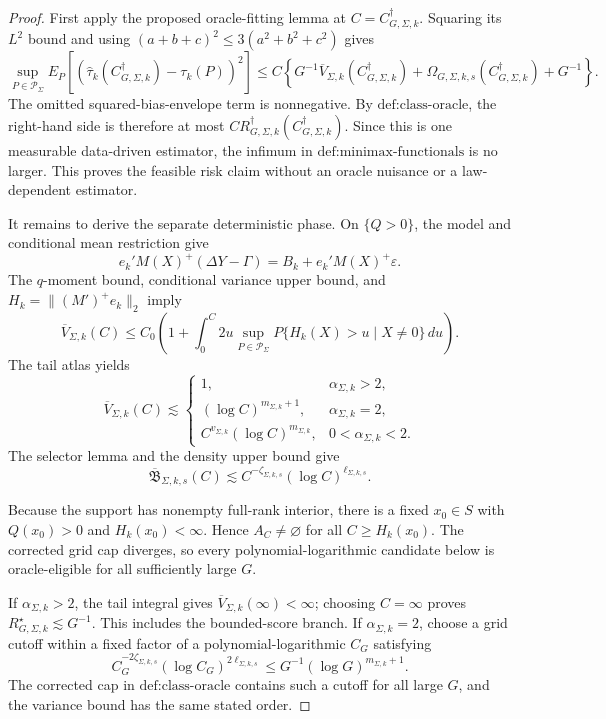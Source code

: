 \documentclass{article}
\begin{document}
\begin{proof}
First apply the proposed oracle-fitting lemma at \(C=C_{G,\Sigma,k}^{\dagger}\). Squaring its \(L^2\) bound and using \((a+b+c)^2\le3(a^2+b^2+c^2)\) gives
\[
\sup_{P\in\mathcal P_\Sigma}E_P[(\widehat\tau_k(C_{G,\Sigma,k}^{\dagger})-\tau_k(P))^2]
\le C\left\{G^{-1}\overline V_{\Sigma,k}(C_{G,\Sigma,k}^{\dagger})
+\Omega_{G,\Sigma,k,s}(C_{G,\Sigma,k}^{\dagger})+G^{-1}\right\}.
\]
The omitted squared-bias-envelope term is nonnegative. By \(\text{def:class-oracle}\), the right-hand side is therefore at most \(C R_{G,\Sigma,k}^{\dagger}(C_{G,\Sigma,k}^{\dagger})\). Since this is one measurable data-driven estimator, the infimum in \(\text{def:minimax-functionals}\) is no larger. This proves the feasible risk claim without an oracle nuisance or a law-dependent estimator.

It remains to derive the separate deterministic phase. On \(\{Q>0\}\), the model and conditional mean restriction give
\[
e_k'M(X)^+(\Delta Y-\Gamma)=B_k+e_k'M(X)^+\varepsilon.
\]
The \(q\)-moment bound, conditional variance upper bound, and \(H_k=\|(M')^+e_k\|_2\) imply
\[
\overline V_{\Sigma,k}(C)
\le C_0\left(1+\int_0^C2u\sup_{P\in\mathcal P_\Sigma}P\{H_k(X)>u\mid X\ne0\}\,du\right).
\]
The tail atlas yields
\[
\overline V_{\Sigma,k}(C)\lesssim
\begin{cases}
1,&\alpha_{\Sigma,k}>2,\\
(\log C)^{m_{\Sigma,k}+1},&\alpha_{\Sigma,k}=2,\\
C^{v_{\Sigma,k}}(\log C)^{m_{\Sigma,k}},&0<\alpha_{\Sigma,k}<2.
\end{cases}
\]
The selector lemma and the density upper bound give
\[
\overline{\mathfrak B}_{\Sigma,k,s}(C)
\lesssim C^{-\zeta_{\Sigma,k,s}}(\log C)^{\ell_{\Sigma,k,s}}.
\]

Because the support has nonempty full-rank interior, there is a fixed \(x_0\in S\) with \(Q(x_0)>0\) and \(H_k(x_0)<\infty\). Hence \(A_C\ne\varnothing\) for all \(C\ge H_k(x_0)\). The corrected grid cap diverges, so every polynomial-logarithmic candidate below is oracle-eligible for all sufficiently large \(G\).

If \(\alpha_{\Sigma,k}>2\), the tail integral gives \(\overline V_{\Sigma,k}(\infty)<\infty\); choosing \(C=\infty\) proves \(R_{G,\Sigma,k}^{\star}\lesssim G^{-1}\). This includes the bounded-score branch. If \(\alpha_{\Sigma,k}=2\), choose a grid cutoff within a fixed factor of a polynomial-logarithmic \(C_G\) satisfying
\[
C_G^{-2\zeta_{\Sigma,k,s}}(\log C_G)^{2\ell_{\Sigma,k,s}}
\le G^{-1}(\log G)^{m_{\Sigma,k}+1}.
\]
The corrected cap in \(\text{def:class-oracle}\) contains such a cutoff for all large \(G\), and the variance bound has the same stated order.


\end{proof}
\end{document}
